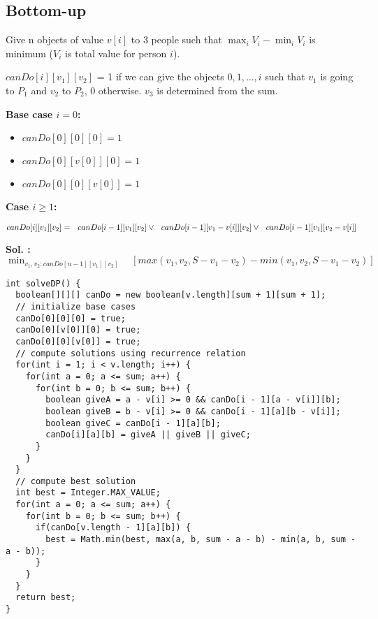 \subsection{Bottom-up}
Give n objects of value $v[i]$ to 3 people such that $\max_i V_i - \min_i V_i$ is minimum ($V_i$ is total value for person $i$).

$canDo[i][v_1][v_2]$ =  1 if we can give the objects $0, 1, \ldots, i$ such that $v_1$ is going to $P_1$ and $v_2$ to $P_2$, 0 otherwise. $v_3$ is determined from the sum. \\

\begin{minipage}{0.25\textwidth}
\textbf{Base case $i = 0$:}
\begin{itemize}
\item $ canDo[0][0][0]  = 1$
\item $ canDo[0][v[0]][0]  = 1$ 
\item $ canDo[0][0][v[0]]  = 1$
\end{itemize}
\end{minipage}
\begin{minipage}{0.25\textwidth}
\textbf{Case $i \geq 1$:} 

$ canDo[i][v_1][v_2] =  \\\text{\ \ }canDo[i - 1][v_1][v_2] \vee \\  \text{\ \ }canDo[i - 1][v_1 - v[i]][v_2] \vee \\  \text{\ \ } canDo[i - 1][v_1][v_2 - v[i]] $
\end{minipage}
\newline
\textbf{Sol. :} $ \min_{v_1, v_2 : canDo[n - 1][v_1][v_2]} \quad [max(v_1, v_2, S - v_1 - v_2) - min(v_1, v_2, S - v_1 - v_2)]$

\begin{lstlisting}
int solveDP() {
  boolean[][][] canDo = new boolean[v.length][sum + 1][sum + 1];
  // initialize base cases
  canDo[0][0][0] = true;
  canDo[0][v[0]][0] = true;
  canDo[0][0][v[0]] = true;
  // compute solutions using recurrence relation
  for(int i = 1; i < v.length; i++) {
    for(int a = 0; a <= sum; a++) {
      for(int b = 0; b <= sum; b++) {
        boolean giveA = a - v[i] >= 0 && canDo[i - 1][a - v[i]][b];
        boolean giveB = b - v[i] >= 0 && canDo[i - 1][a][b - v[i]];
        boolean giveC = canDo[i - 1][a][b];
        canDo[i][a][b] = giveA || giveB || giveC;
      }
    }
  }
  // compute best solution
  int best = Integer.MAX_VALUE;
  for(int a = 0; a <= sum; a++) {
    for(int b = 0; b <= sum; b++) {
      if(canDo[v.length - 1][a][b]) {
        best = Math.min(best, max(a, b, sum - a - b) - min(a, b, sum - a - b));
      }
    }
  }
  return best;
}
\end{lstlisting}
